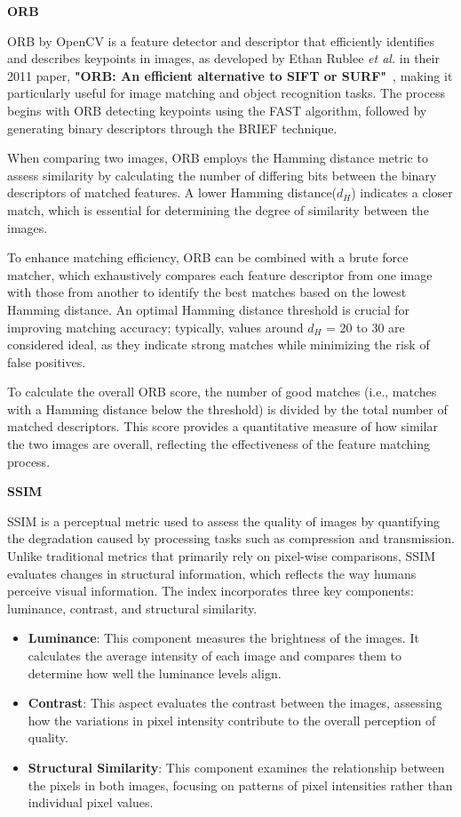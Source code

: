 \documentclass[12pt,DIV14,BCOR12mm,a4paper,footinclude=false,headinclude,parskip=half-,twoside,openright,cleardoublepage=empty,toc=index,bibliography=totoc,listof=totoc]{scrreprt}
\numberwithin{equation}{chapter}
\begin{document}
\textbf{ORB}

ORB by OpenCV is a feature detector and descriptor that efficiently identifies and describes keypoints in images, as developed by Ethan Rublee \textit{et al.} in their 2011 paper, \textbf{"ORB: An efficient alternative to SIFT or SURF"}~\cite{ORB}, making it particularly useful for image matching and object recognition tasks. The process begins with ORB detecting keypoints using the FAST algorithm, followed by generating binary descriptors through the BRIEF technique.

When comparing two images, ORB employs the Hamming distance metric to assess similarity by calculating the number of differing bits between the binary descriptors of matched features. A lower Hamming distance(\(d_H\)) indicates a closer match, which is essential for determining the degree of similarity between the images.

To enhance matching efficiency, ORB can be combined with a brute force matcher, which exhaustively compares each feature descriptor from one image with those from another to identify the best matches based on the lowest Hamming distance. An optimal Hamming distance threshold is crucial for improving matching accuracy; typically, values around \(d_H\) = 20 to 30 are considered ideal, as they indicate strong matches while minimizing the risk of false positives.

To calculate the overall ORB score, the number of good matches (i.e., matches with a Hamming distance below the threshold) is divided by the total number of matched descriptors. This score provides a quantitative measure of how similar the two images are overall, reflecting the effectiveness of the feature matching process.

\textbf{SSIM}

SSIM is a perceptual metric used to assess the quality of images by quantifying the degradation caused by processing tasks such as compression and transmission. Unlike traditional metrics that primarily rely on pixel-wise comparisons, SSIM evaluates changes in structural information, which reflects the way humans perceive visual information. The index incorporates three key components: luminance, contrast, and structural similarity.

\begin{itemize}
    \item \textbf{Luminance}: This component measures the brightness of the images. It calculates the average intensity of each image and compares them to determine how well the luminance levels align.
    
    \item \textbf{Contrast}: This aspect evaluates the contrast between the images, assessing how the variations in pixel intensity contribute to the overall perception of quality.
    
    \item \textbf{Structural Similarity}: This component examines the relationship between the pixels in both images, focusing on patterns of pixel intensities rather than individual pixel values.
\end{itemize}
\end{document}
